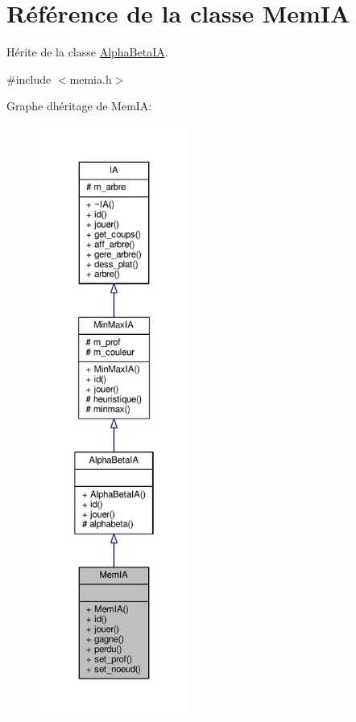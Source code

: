 \hypertarget{classMemIA}{}\section{Référence de la classe Mem\+IA}
\label{classMemIA}


Hérite de la classe \hyperlink{classAlphaBetaIA}{Alpha\+Beta\+IA}.  




{\ttfamily \#include $<$memia.\+h$>$}



Graphe d\textquotesingle{}héritage de Mem\+IA\+:\nopagebreak
\begin{figure}[H]
\begin{center}
\leavevmode
\includegraphics[height=550pt]{classMemIA__inherit__graph}
\end{center}
\end{figure}


